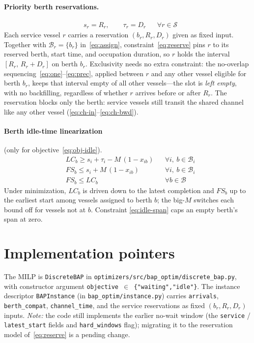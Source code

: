 \documentclass[11pt]{article}
\newcommand{\B}{\mathcal{B}}
\newcommand{\Svc}{\mathcal{S}}
\newcommand{\Bi}{\mathcal{B}_i}
\newcommand{\bigM}{M}
\begin{document}
\paragraph{Priority berth reservations.}
\begin{align}
& s_r = R_r, \qquad \tau_r = D_r && \forall r\in\Svc \label{eq:reserve}
\end{align}
Each service vessel $r$ carries a reservation $(b_r,R_r,D_r)$ given as fixed
input. Together with $\mathcal{B}_r=\{b_r\}$ in~\eqref{eq:assign},
constraint~\eqref{eq:reserve} pins $r$ to its reserved berth, start time, and
occupation duration, so $r$ holds the interval $[R_r,\,R_r+D_r]$ on berth $b_r$.
Exclusivity needs no extra constraint: the no-overlap
sequencing~\eqref{eq:one}--\eqref{eq:prec}, applied between $r$ and any other
vessel eligible for berth $b_r$, keeps that interval empty of all other
vessels---the slot is \emph{left empty}, with no backfilling, regardless of
whether $r$ arrives before or after $R_r$. The reservation blocks only the
berth: service vessels still transit the shared channel like any other vessel
(\eqref{eq:ch-in}--\eqref{eq:ch-bwd}).

\paragraph{Berth idle-time linearization} (only for objective~\eqref{eq:obj-idle}).
\begin{align}
& \mathit{LC}_b \ge s_i + \tau_i - \bigM\,(1-x_{ib}) && \forall i,\ b\in\Bi \label{eq:idle-lc}\\
& \mathit{FS}_b \le s_i + \bigM\,(1-x_{ib}) && \forall i,\ b\in\Bi \label{eq:idle-fs}\\
& \mathit{FS}_b \le \mathit{LC}_b && \forall b\in\B \label{eq:idle-span}
\end{align}
Under minimization, $\mathit{LC}_b$ is driven down to the latest completion and
$\mathit{FS}_b$ up to the earliest start among vessels assigned to berth $b$;
the big-$M$ switches each bound off for vessels not at $b$. Constraint
\eqref{eq:idle-span} caps an empty berth's span at zero.

\section{Implementation pointers}
The MILP is \texttt{DiscreteBAP} in
\texttt{optimizers/src/bap\_optim/discrete\_bap.py}, with constructor argument
\texttt{objective\,$\in$\,\{"waiting","idle"\}}. The instance descriptor
\texttt{BAPInstance} (in \texttt{bap\_optim/instance.py}) carries
\texttt{arrivals}, \texttt{berth\_compat}, \texttt{channel\_time}, and the
service reservations as fixed $(b_r,R_r,D_r)$ inputs. \emph{Note:} the code
still implements the earlier no-wait window (the \texttt{service} /
\texttt{latest\_start} fields and \texttt{hard\_windows} flag); migrating it to
the reservation model of~\eqref{eq:reserve} is a pending change.
\end{document}
